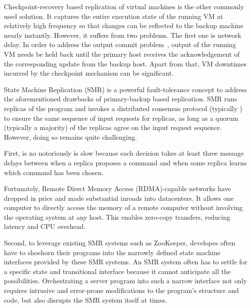 Checkpoint-recovery based replication of virtual machines is the other commonly used solution. 
It captures the entire execution state of the running VM at relatively high frequency so that 
changes can be reflected to the backup machine nearly instantly. However, it suffers from two 
problems. The first one is network delay. In order to address the output commit 
problem~\cite{strom1987volatile}, output of the running VM needs be held back until the primary 
host receives the acknowledgement of the corresponding update from the backup host. Apart from 
that, VM downtimes incurred by the checkpoint mechanism can be significant.

State Machine Replication (SMR) is a powerful fault-tolerance concept to address the aforementioned 
drawbacks of primary-backup based replication. SMR runs replicas of the program and invokes a 
distributed consensus protocol (typically \paxos) to ensure the same sequence of input requests 
for replicas, as long as a quorum (typically a majority) of the replicas agree on the input 
request sequence. However, doing so remains quite challenging. 

First, \paxos is no notoriously is slow because each decision takes at least three message delays 
between when a replica proposes a command and when some replica learns which command has been chosen.

Fortunately, Remote Direct Memory Access (RDMA)-capable networks have dropped in price and made 
substantial inroads into datacenters. It allows one computer to directly access the memory of 
a remote computer without involving the operating system at any host. This enables zero-copy 
transfers, reducing latency and CPU overhead.

Second, to leverage existing SMR systems such as ZooKeeper, developes often have to shoehorn their 
programs into the narrowly defined state machine interfaces provided by these SMR systems. An SMR 
system often has to settle for a specific state and transitional interface because it cannot 
anticipate all the possibilities. Orchestrating a server program into such a narrow interface not 
only requires intrusive and error-prone modifications to the program's structure and code, but also 
disrupts the SMR system itself at times.

